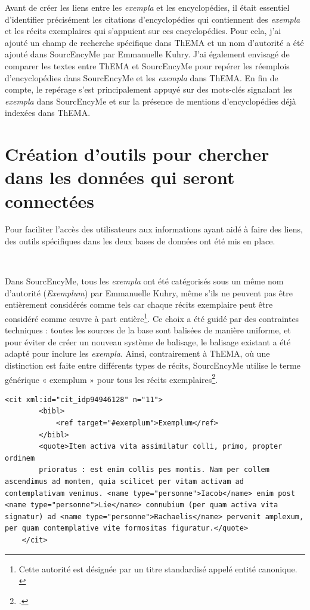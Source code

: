 Avant de créer les liens entre les \textit{exempla} et les encyclopédies, il était essentiel d’identifier précisément les citations d'encyclopédies qui contiennent des \textit{exempla} et les récits exemplaires qui s'appuient sur ces encyclopédies. Pour cela, j'ai ajouté un champ de recherche spécifique dans ThEMA et  un nom d'autorité a été ajouté dans SourcEncyMe par Emmanuelle Kuhry. J'ai également envisagé de comparer les textes entre ThEMA et SourcEncyMe pour repérer les réemplois d'encyclopédies dans SourcEncyMe et les \textit{exempla} dans ThEMA. En fin de compte, le repérage s'est principalement appuyé sur des mots-clés signalant les \textit{exempla} dans SourcEncyMe et sur la présence de mentions d'encyclopédies déjà indexées dans ThEMA.


\section{Création d'outils pour chercher dans les données qui seront connectées}
Pour faciliter l'accès des utilisateurs aux informations ayant aidé à faire des liens, des outils spécifiques dans les deux bases de données ont été mis en place.

\

Dans SourcEncyMe, tous les \textit{exempla} ont été catégorisés sous un même nom d'autorité (\textit{Exemplum}) par Emmanuelle Kuhry, même s'ils ne peuvent pas être entièrement considérés comme tels car chaque récits exemplaire peut être considéré comme œuvre à part entière\footnote{Cette autorité est désignée par un titre standardisé appelé entité canonique. \cite{SourcEncyMe}}. Ce choix a été guidé par des contraintes techniques : toutes les sources de la base sont balisées de manière uniforme, et pour éviter de créer un nouveau système de balisage, le balisage existant a été adapté pour inclure les \textit{exempla}. Ainsi, contrairement à ThEMA, où une distinction est faite entre différents types de récits, SourcEncyMe utilise le terme générique « exemplum » pour tous les récits exemplaires\footcite{InformationsThEMA}. \\

\begin{lstlisting}[breaklines=true]
	<cit xml:id="cit_idp94946128" n="11">
		<bibl>
			<ref target="#exemplum">Exemplum</ref>
		</bibl>
		<quote>Item activa vita assimilatur colli, primo, propter ordinem
		prioratus : est enim collis pes montis. Nam per collem ascendimus ad montem, quia scilicet per vitam activam ad contemplativam venimus. <name type="personne">Iacob</name> enim post <name type="personne">Lie</name> connubium (per quam activa vita signatur) ad <name type="personne">Rachaelis</name> pervenit amplexum, per quam contemplative vite formositas figuratur.</quote>
	</cit>
\end{lstlisting}


